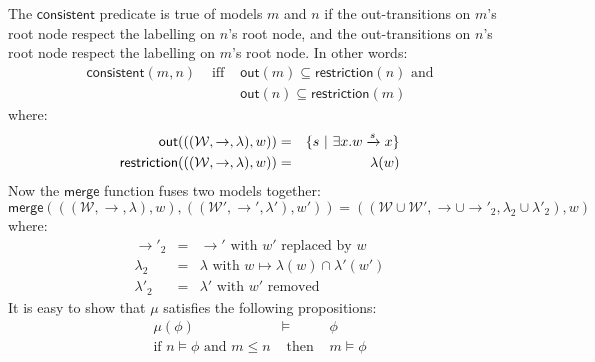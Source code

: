 \noindent The $\mathsf{consistent}$ predicate is true of  models $m$ and $n$ if the out-transitions on $m$'s root node respect the labelling on $n$'s root node, and the out-transitions on $n$'s root node respect the labelling on $m$'s root node. In other words:
\begin{eqnarray}
\mathsf{consistent}(m, n) & \mbox{ iff } & \mathsf{out}(m) \subseteq \mathsf{restriction}(n) \mbox{ and} \nonumber \\
& & \mathsf{out}(n) \subseteq \mathsf{restriction}(m) \nonumber
\end{eqnarray}
where:
\begin{eqnarray}
\mathsf{out}(((\mathcal{W},\rightarrow,\lambda),w)) & = & \{ s \ | \  \exists x . w \xrightarrow{s} x \} \nonumber \\
\mathsf{restriction}(((\mathcal{W},\rightarrow,\lambda),w)) & = & \lambda(w) \nonumber
\end{eqnarray}
Now the $\mathsf{merge}$ function fuses two  models together:
\[
\mathsf{merge}( ( (\mathcal{W}, \rightarrow, \lambda), w),  ( (\mathcal{W}', \rightarrow', \lambda'), w')) = ((\mathcal{W} \cup \mathcal{W}', \rightarrow \cup \rightarrow'_2, \lambda_2 \cup \lambda'_2), w)
\]
where:
\begin{eqnarray}
\rightarrow'_2 & = & \rightarrow' \mbox{ with } w' \mbox{ replaced by } w \nonumber \\
\lambda_2 & = & \lambda \mbox{ with } w \mapsto \lambda(w) \cap \lambda'(w') \nonumber \\
\lambda'_2 & = & \lambda' \mbox{ with } w' \mbox{ removed } \nonumber
\end{eqnarray}
It is easy to show that $\mu$ satisfies the following propositions:
\begin{eqnarray}
\mu(\phi) & \models & \phi \nonumber \\
\mbox{if }n \models \phi \mbox{ and } m \leq n & \mbox{ then } & m \models \phi \nonumber
\end{eqnarray}

